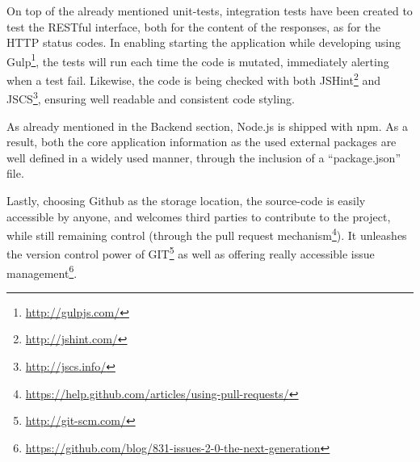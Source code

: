 On top of the already mentioned unit-tests, integration tests have been created
to test the RESTful interface, both for the content of the responses, as for the
HTTP status codes. In enabling starting the application while developing using 
Gulp\footnote{\url{http://gulpjs.com/}}, 
the tests will run each time the code is mutated, immediately alerting
when a test fail. Likewise, the code is being checked with both 
JSHint\footnote{\url{http://jshint.com/}}
and JSCS\footnote{\url{http://jscs.info/}}, 
ensuring well readable and consistent code styling.

As already mentioned in the Backend section, Node.js is shipped with npm. As a
result, both the core application information as the used external packages are 
well defined in a widely used manner, through the inclusion of a 
``package.json'' file.

Lastly, choosing Github as the storage location, the \gls{source-code} is easily
accessible by anyone, and welcomes third parties to contribute to the project, 
while still remaining control (through the pull request 
mechanism\footnote{\url{https://help.github.com/articles/using-pull-requests/}}). 
It unleashes the version control power of GIT\footnote{\url{http://git-scm.com/}}
as well as offering really accessible issue 
management\footnote{\url{https://github.com/blog/831-issues-2-0-the-next-generation}}.
